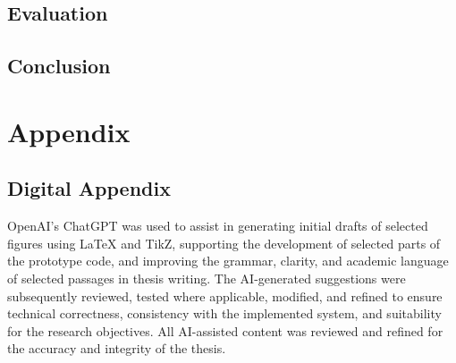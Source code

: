 \documentclass[twoside,a4paper,11pt,openright]{report}
\begin{document}
\chapter{Evaluation}
\label{chap:evaluation}


\chapter{Conclusion}
\label{chap:conclusion}


\cleardoublepage



\appendix
\cleardoublepage
\part*{Appendix}
\markboth{}{}
\captionsetup{list=no}

\cleardoublepage

\chapter{Digital Appendix}
\label{chap:digital_appendix}


\cleardoublepage
{}

OpenAI's ChatGPT was used to assist in generating
initial drafts of selected figures using LaTeX and
TikZ, supporting the development of selected parts
of the prototype code, and improving the grammar,
clarity, and academic language of selected passages in thesis writing. The AI-generated suggestions
were subsequently reviewed, tested where applicable,
modified, and refined to ensure technical correctness,
consistency with the implemented system, and
suitability for the research objectives. All AI-assisted content was reviewed and refined for the
accuracy and integrity of the thesis.



\cleardoublepage

\end{document}

